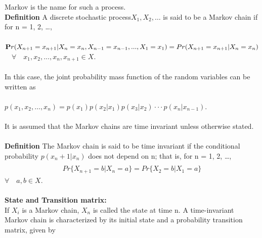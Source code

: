 \documentclass[10pt,twocolumn,letterpaper]{article}
\begin{document}
Markov is the name for such a process.\\
\textbf{Definition} A discrete stochastic process\begin{math}
X_1 , X_2 , \dots 
\end{math} is said to be a
Markov chain if for n = 1, 2, \dots , \\
\\
$
\begin{mathbf}
Pr(X_{n+1} = x_{n+1} |X_n = x_n , X_{n-1} = x_{n-1} , . . . , X_1 = x_1 )
= Pr (X_{n+1} = x_{n+1} |X_n = x_n )
\end{mathbf}$\\

\begin{math}
\quad \forall \quad x_1 , x_2 , . . . , x_n , x_{n+1} \in X .
\end{math}\\ 
\\
In this case, the joint probability mass function of the random variables
can be written as\\
\\ \begin{math}
p(x_1 , x_2 , \dots, x_n ) = p(x_1 )p(x_2 |x_1 )p(x_3 |x_2 ) · · · p(x_n |x_{n-1} ).
\end{math}\\
\\ It is assumed that the Markov chains are time invariant unless otherwise
stated. \\
\\ \textbf{Definition} The Markov chain is said to be time invariant if the conditional probability \begin{math} p(x_n+1 |x_n )\end{math} does not depend on n; that is, for n = 1, 2, \dots , 
\begin{eqnarray*}
\\ Pr\{X_{n+1} = b|X_n = a\} = Pr\{X_2 = b|X_1 = a\} 
\end{eqnarray*} \begin{math} \forall \quad  a, b\in X .\end{math} \\
\\
\textbf{State and Transition matrix:} \\ If \begin{math} {X_i} \end{math} is a Markov chain, \begin{math} X_n \end{math} is called the state at time n. A time-invariant Markov chain is characterized by its initial state and a probability transition matrix, given by
\end{document}
